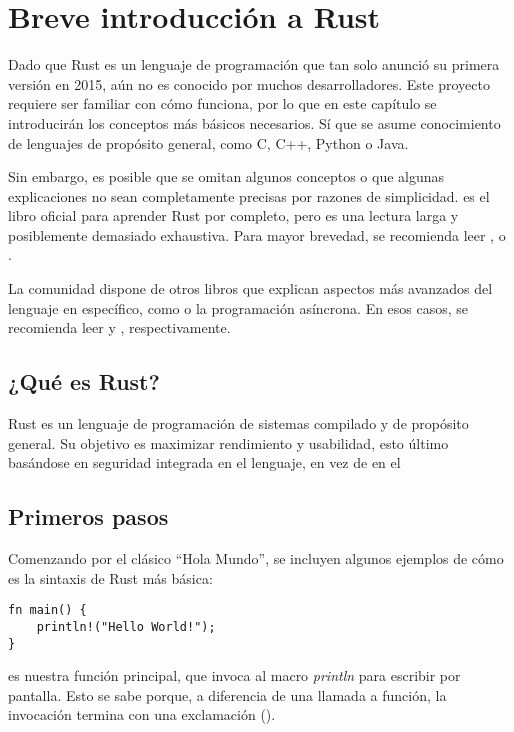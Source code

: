 
\chapter{Breve introducción a Rust}\label{ch:rust}

Dado que Rust es un lenguaje de programación que tan solo anunció su primera
versión en 2015, aún no es conocido por muchos desarrolladores. Este proyecto
requiere ser familiar con cómo funciona, por lo que en este capítulo se
introducirán los conceptos más básicos necesarios. Sí que se asume conocimiento
de lenguajes de propósito general, como C, C++, Python o Java.

Sin embargo, es posible que se omitan algunos conceptos o que algunas
explicaciones no sean completamente precisas por razones de simplicidad.
\textcite{rustfullbook} es el libro oficial para aprender Rust por completo,
pero es una lectura larga y posiblemente demasiado exhaustiva. Para mayor
brevedad, se recomienda leer \textcite{rustprofessionals},
\textcite{rustgentleintro} o \textcite{rust30min}.

La comunidad dispone de otros libros que explican aspectos más avanzados del
lenguaje en específico, como \unsafe o la programación asíncrona. En esos casos,
se recomienda leer \textcite{rustnomicon} y \textcite{rustasyncbook},
respectivamente.

\section{¿Qué es Rust?}

Rust es un lenguaje de programación de sistemas compilado y de propósito
general. Su objetivo es maximizar rendimiento y usabilidad, esto último
basándose en seguridad integrada en el lenguaje, en vez de en el \

\section{Primeros pasos}

Comenzando por el clásico ``Hola Mundo'', se incluyen algunos ejemplos de cómo
es la sintaxis de Rust más básica:

\begin{verbatim}
fn main() {
    println!("Hello World!");
}
\end{verbatim}

 es nuestra función principal, que invoca al macro \emph{println}
para escribir por pantalla. Esto se sabe porque, a diferencia de una llamada a
función, la invocación termina con una exclamación (\code{!}).

